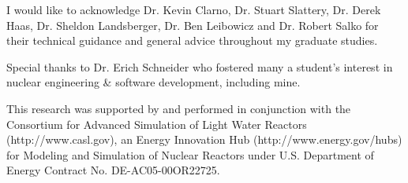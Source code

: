 
\acknowledgments

I would like to acknowledge Dr. Kevin Clarno, Dr. Stuart Slattery, Dr. Derek Haas, Dr. Sheldon Landsberger, Dr. Ben Leibowicz and Dr. Robert Salko for their technical guidance and general advice throughout my graduate studies.

Special thanks to Dr. Erich Schneider who fostered many a student's interest in nuclear engineering \& software development, including mine.

This research was supported by and performed in conjunction with the Consortium for Advanced Simulation of Light Water Reactors (http://www.casl.gov), an Energy Innovation Hub (http://www.energy.gov/hubs) for Modeling and Simulation of Nuclear Reactors under U.S. Department of Energy Contract No. DE-AC05-00OR22725.
\newpage
